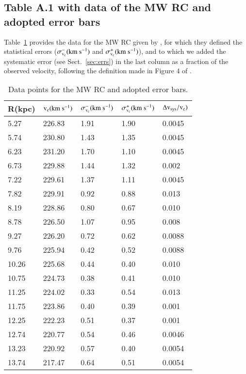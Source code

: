 \documentclass{aa}
\begin{document}
\begin{appendix}

\section{Table A.1 with data of the MW RC and adopted error bars}
Table~\ref{tab:A1}  provides the data for the MW RC given by \citet{Eilers2019}, for which they defined the statistical errors ($\rm \sigma^{-}_{v_c} (km\ s^{-1})$ and $\rm \sigma^{+}_{v_c} (km\ s^{-1})$), and to which we added the systematic error (see Sect.~\ref{sec:errs}) in the last column as a fraction of the observed velocity, following the definition made in Figure 4 of \citet{Eilers2019}.

\begin{table}
        \centering
 \caption{Data points for the MW RC and adopted error bars.}
 \label{tab:A1}
\begin{tabular}{lllll}
\hline\hline
R(kpc) & $\rm v_c (km\ s^{-1})$ & $\rm \sigma^{-}_{v_c} (km\ s^{-1})$ & $\rm \sigma^{+}_{v_c} (km\ s^{-1})$ & $\rm \Delta v_{sys}/v_c) $ \\ 
\hline
5.27 & 226.83 & 1.91 & 1.90 &   0.0045 \\
5.74 & 230.80 & 1.43 & 1.35 &   0.0045 \\
6.23 & 231.20 & 1.70 & 1.10 &   0.0045 \\
6.73 & 229.88 & 1.44 & 1.32 &   0.002 \\
7.22 & 229.61 & 1.37 & 1.11 &   0.0045 \\
7.82 & 229.91 & 0.92 & 0.88 &   0.013 \\
8.19 & 228.86 & 0.80 & 0.67 &   0.010 \\
8.78 & 226.50 & 1.07 & 0.95 &   0.008 \\
9.27 & 226.20 & 0.72 & 0.62 &   0.0088 \\
9.76 & 225.94 & 0.42 & 0.52 &   0.0088 \\
10.26 & 225.68 & 0.44 & 0.40 &  0.010 \\
10.75 & 224.73 & 0.38 & 0.41 &  0.010 \\
11.25 & 224.02 & 0.33 & 0.54 &  0.013 \\
11.75 & 223.86 & 0.40 & 0.39 &  0.001 \\
12.25 & 222.23 & 0.51 & 0.37 &  0.001 \\
12.74 & 220.77 & 0.54 & 0.46 &  0.0046 \\
13.23 & 220.92 & 0.57 & 0.40 &  0.0054 \\
13.74 & 217.47 & 0.64 & 0.51 &  0.0054 \\

\end{tabular}
\end{table}
\end{appendix}
\end{document}
